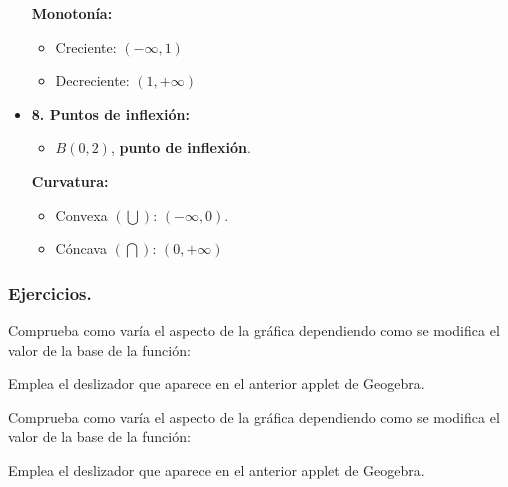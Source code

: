 \begin{itemize}
\begin{itemize}
	\end{itemize}
	\textbf{Monotonía: }\\
	\begin{itemize}
		\item Creciente: $(-\infty, 1)$
		\item Decreciente: $(1, +\infty)$
	\end{itemize}
	\item \textbf{8. Puntos de inflexión:}\\
	\begin{itemize}
		\item $B(0,2)$, \textbf{punto de inflexión}.\\
	\end{itemize}
	\textbf{Curvatura:}\\
	\begin{itemize}
		\item Convexa $(\bigcup)$: $(-\infty, 0)$.
		\item Cóncava $(\bigcap)$: $(0, +\infty)$
	\end{itemize}
\end{itemize}
\subsubsection{Ejercicios.}
\begin{ex}
Comprueba como varía el aspecto de la gráfica dependiendo como se modifica el valor de la base de la función:
	\begin{sol}
		Emplea el deslizador que aparece en el anterior applet de Geogebra. 
	\end{sol}
\end{ex}

\begin{ex}
	Comprueba como varía el aspecto de la gráfica dependiendo como se modifica el valor de la base de la función:
	\begin{sol}
		Emplea el deslizador que aparece en el anterior applet de Geogebra. 
	\end{sol}
\end{ex}